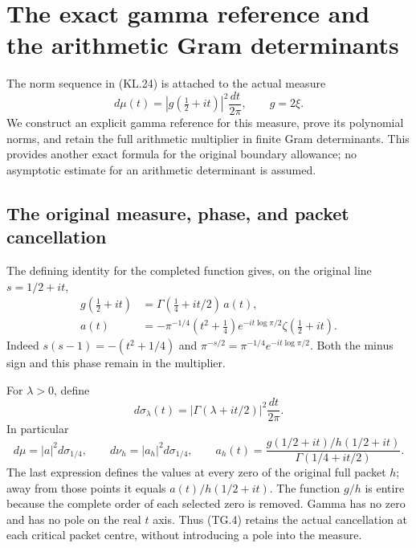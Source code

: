 \section{The exact gamma reference and the arithmetic Gram determinants}
\label{sec:theta-gamma-reference}

The norm sequence in (KL.24) is attached to the actual measure
\[
 d\mu(t)=|g(\tfrac12+it)|^2\frac{dt}{2\pi},\qquad g=2\xi.
                                                               \tag{TG.1}
\]
We construct an explicit gamma reference for this measure, prove its
polynomial norms, and retain the full arithmetic multiplier in finite
Gram determinants.  This provides another exact formula for the
original boundary allowance; no asymptotic estimate for an arithmetic
determinant is assumed.

\subsection{The original measure, phase, and packet cancellation}

The defining identity for the completed function gives, on the original
line \(s=1/2+it\),
\[
 \begin{aligned}
 g(\tfrac12+it)&=\Gamma(\tfrac14+it/2)\,a(t),\\
 a(t)&=-\pi^{-1/4}(t^2+\tfrac14)
           e^{-it\log\pi/2}\zeta(\tfrac12+it).
 \end{aligned}                                                   \tag{TG.2}
\]
Indeed \(s(s-1)=-(t^2+1/4)\) and
\(\pi^{-s/2}=\pi^{-1/4}e^{-it\log\pi/2}\).  Both the minus
sign and this phase remain in the multiplier.

For \(\lambda>0\), define
\[
 d\sigma_\lambda(t)=|\Gamma(\lambda+it/2)|^2\frac{dt}{2\pi}.
                                                               \tag{TG.3}
\]
In particular
\[
 d\mu=|a|^2d\sigma_{1/4},\qquad
 d\nu_h=|a_h|^2d\sigma_{1/4},\qquad
 a_h(t)=\frac{g(1/2+it)/h(1/2+it)}{\Gamma(1/4+it/2)}.
                                                               \tag{TG.4}
\]
The last expression defines the values at every zero of the original
full packet \(h\); away from those points it equals
\(a(t)/h(1/2+it)\).  The function \(g/h\) is entire because
the complete order of each selected zero is removed.  Gamma has no
zero and has no pole on the real \(t\) axis.  Thus (TG.4) retains
the actual cancellation at each critical packet centre, without
introducing a pole into the measure.

